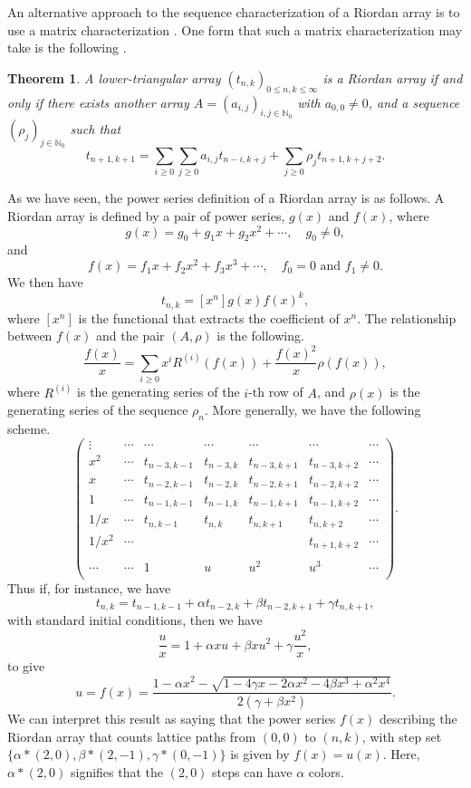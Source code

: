 \documentclass[12pt,reqno]{article}
\newtheorem{theorem}{Theorem}
\theoremstyle{definition}
\begin{document}
An alternative approach to the sequence characterization of a Riordan array is to use a matrix characterization \cite{He_M, Merlini}.  One form that such a matrix characterization may take is the following \cite{He_M, Merlini}.
\begin{theorem} A lower-triangular array $(t_{n,k})_{0 \le n,k \le \infty}$ is a Riordan array if and only if there exists another array $A=(a_{i,j})_{i,j \in \mathbb{N}_0}$ with $a_{0,0} \ne 0$, and a sequence $(\rho_j)_{j \in \mathbb{N}_0}$ such that
$$t_{n+1,k+1}=\sum_{i \ge 0} \sum_{j \ge 0} a_{i,j} t_{n-i, k+j} + \sum_{j \ge 0} \rho_j t_{n+1,k+j+2}.$$
\end{theorem}
As we have seen, the power series definition of a Riordan array is as follows. A Riordan array is defined by a pair of power series, $g(x)$ and $f(x)$, where
$$g(x)=g_0 + g_1 x + g_2 x^2+ \cdots, \quad g_0 \ne 0,$$ and
$$f(x)=f_1 x + f_2 x^2+ f_3 x^3+\cdots, \quad f_0=0 \text{ and } f_1 \ne 0.$$
We then have
$$t_{n,k}=[x^n] g(x)f(x)^k,$$ where $[x^n]$ is the functional that extracts the coefficient of $x^n$.
The relationship between $f(x)$ and the pair $(A, \rho)$ is the following.
$$\frac{f(x)}{x}=\sum_{i \ge 0} x^i R^{(i)}(f(x))+\frac{f(x)^2}{x}\rho(f(x)),$$ where
$R^{(i)}$ is the generating series of the $i$-th row of $A$, and $\rho(x)$ is the generating series of the sequence $\rho_n$.
More generally, we have the following scheme.
$$\left(
\begin{array}{ccccccc}
\vdots & \cdots & \cdots & \cdots & \cdots & \cdots & \cdots \\
x^2 & \cdots & t_{n-3,k-1} & t_{n-3,k} & t_{n-3,k+1} & t_{n-3,k+2} & \cdots \\
x & \cdots & t_{n-2,k-1} & t_{n-2,k} & t_{n-2,k+1} & t_{n-2,k+2} & \cdots \\
1 & \cdots & t_{n-1,k-1} & t_{n-1,k} & t_{n-1,k+1} & t_{n-1,k+2} & \cdots \\
1/x & \cdots & t_{n,k-1} & t_{n,k} & t_{n,k+1} & t_{n,k+2} & \cdots \\
1/x^2 & \cdots &  &  &  & t_{n+1,k+2} & \cdots \\
 &  &  &  &  &  &  \\
\cdots & \cdots & 1 & u & u^2 & u^3 & \cdots \\
\end{array}
\right).$$
Thus if, for instance, we have
$$t_{n,k}=t_{n-1,k-1}+ \alpha t_{n-2,k}+ \beta t_{n-2,k+1}+ \gamma t_{n,k+1},$$ with standard initial conditions, then we have
$$\frac{u}{x}=1+\alpha xu+\beta xu^2+ \gamma \frac{u^2}{x},$$ to give
$$u=f(x)=\frac{1-\alpha x^2-\sqrt{1-4 \gamma x - 2\alpha x^2-4 \beta x^3+\alpha^2 x^4}}{2(\gamma+\beta x^2)}.$$
We can interpret this result as saying that the power series $f(x)$ describing the Riordan array that counts lattice paths from $(0,0)$ to $(n,k)$, with step set $\{\alpha*(2,0), \beta*(2,-1), \gamma*(0,-1)\}$ is given by $f(x)=u(x)$. Here, $\alpha*(2,0)$ signifies that the $(2,0)$ steps can have $\alpha$ colors.
\end{document}
